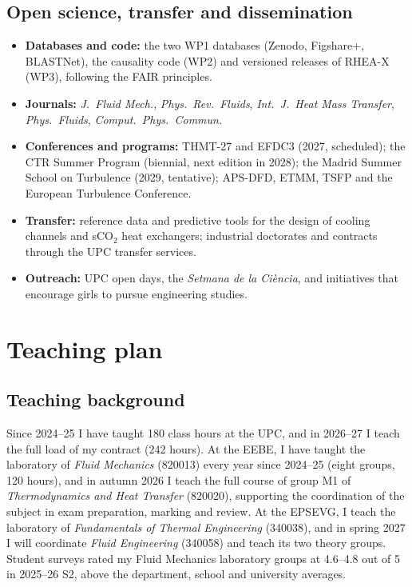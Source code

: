 \documentclass[11pt]{article}
\begin{document}
\subsection{Open science, transfer and dissemination}\label{sec:dissemination}
\begin{itemize}
  \item \textbf{Databases and code:} the two WP1 databases (Zenodo, Figshare+, BLASTNet), the
  causality code (WP2) and versioned releases of RHEA-X (WP3), following the FAIR principles.
  \item \textbf{Journals:} \emph{J.\ Fluid Mech.}, \emph{Phys.\ Rev.\ Fluids}, \emph{Int.\ J.\
  Heat Mass Transfer}, \emph{Phys.\ Fluids}, \emph{Comput.\ Phys.\ Commun.}
  \item \textbf{Conferences and programs:} THMT-27 and EFDC3 (2027, scheduled); the CTR Summer
  Program (biennial, next edition in 2028); the Madrid Summer School on Turbulence (2029,
  tentative); APS-DFD, ETMM, TSFP and the European Turbulence Conference.
  \item \textbf{Transfer:} reference data and predictive tools for the design of cooling
  channels and sCO$_2$ heat exchangers; industrial doctorates and contracts through the UPC
  transfer services.
  \item \textbf{Outreach:} UPC open days, the \emph{Setmana de la Ci\`encia}, and initiatives
  that encourage girls to pursue engineering studies.
\end{itemize}

\section{Teaching plan}\label{sec:teaching}

\subsection{Teaching background}
Since 2024--25 I have taught 180 class hours at the UPC, and in 2026--27 I teach the full
load of my contract (242 hours). At the EEBE, I have taught the laboratory of \emph{Fluid
Mechanics} (820013) every year since 2024--25 (eight groups, 120 hours), and in autumn
2026 I teach the full course of group M1 of \emph{Thermodynamics and Heat Transfer}
(820020), supporting the coordination of the subject in exam preparation, marking and
review. At the EPSEVG, I teach the laboratory of \emph{Fundamentals of Thermal
Engineering} (340038), and in spring 2027 I will coordinate \emph{Fluid Engineering}
(340058) and teach its two theory groups. Student surveys rated my Fluid Mechanics
laboratory groups at 4.6--4.8 out of 5 in 2025--26 S2, above the department, school and
university averages.
\end{document}

